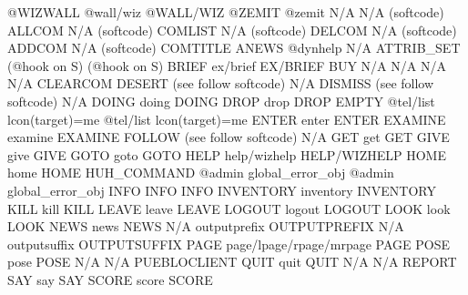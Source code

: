 \documentclass[letterpaper,10pt,english]{sphinxmanual}
\begin{document}
\begin{description}
@WIZWALL                @wall/wiz                      @WALL/WIZ
@ZEMIT                  @zemit                         N/A
N/A                     (softcode)                     ALLCOM
N/A                     (softcode)                     COMLIST
N/A                     (softcode)                     DELCOM
N/A                     (softcode)                     ADDCOM
N/A                     (softcode)                     COMTITLE
ANEWS                   @dynhelp                       N/A
ATTRIB\_SET              (@hook on S)                   (@hook on S)
BRIEF                   ex/brief                       EX/BRIEF
BUY                     N/A                            N/A
N/A                     N/A                            CLEARCOM
DESERT                  (see follow softcode)          N/A
DISMISS                 (see follow softcode)          N/A
DOING                   doing                          DOING
DROP                    drop                           DROP
EMPTY                   @tel/list lcon(target)=me      @tel/list lcon(target)=me
ENTER                   enter                          ENTER
EXAMINE                 examine                        EXAMINE
FOLLOW                  (see follow softcode)          N/A
GET                     get                            GET
GIVE                    give                           GIVE
GOTO                    goto                           GOTO
HELP                    help/wizhelp                   HELP/WIZHELP
HOME                    home                           HOME
HUH\_COMMAND             @admin global\_error\_obj        @admin global\_error\_obj
INFO                    INFO                           INFO
INVENTORY               inventory                      INVENTORY
KILL                    kill                           KILL
LEAVE                   leave                          LEAVE
LOGOUT                  logout                         LOGOUT
LOOK                    look                           LOOK
NEWS                    news                           NEWS
N/A                     outputprefix                   OUTPUTPREFIX
N/A                     outputsuffix                   OUTPUTSUFFIX
PAGE                    page/lpage/rpage/mrpage        PAGE
POSE                    pose                           POSE
N/A                     N/A                            PUEBLOCLIENT
QUIT                    quit                           QUIT
N/A                     N/A                            REPORT
SAY                     say                            SAY
SCORE                   score                          SCORE

\end{description}
\end{document}
